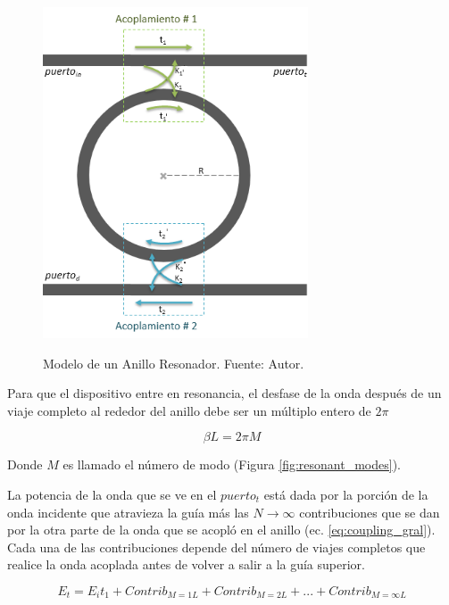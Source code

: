\begin{figure}[h!]
\caption{Modelo de un Anillo Resonador. Fuente: Autor.}
\centering
\includegraphics[width=0.7\textwidth,natwidth=396,natheight=495]{figs/rr_model.PNG}
\label{fig:rr_model}
\end{figure} 

Para que el dispositivo entre en resonancia, el desfase de la onda después de un viaje
completo al rededor del anillo debe ser un múltiplo entero de $2 \pi$

\begin{equation}
\beta L = 2 \pi M
\label{eq:resonant_condition}
\end{equation} 
 
Donde $M$ es llamado el número de modo (Figura \ref{fig:resonant_modes}). 

La potencia de la onda que se ve en el $puerto_t$ está dada por la porción de la onda incidente
que atravieza la guía más las $N\to\infty$ contribuciones que se dan por la otra parte de la
onda que se acopló en el anillo (ec. \ref{eq:coupling_gral}). 
Cada una de las contribuciones depende del número de viajes completos que realice la onda
acoplada antes de volver a salir a la guía superior.


\begin{equation}
E_t = E_i t_1 + Contrib_{M=1L} + Contrib_{M=2L} + ... + Contrib_{M=\infty L}
\label{eq:coupling_gral}
\end{equation} 

